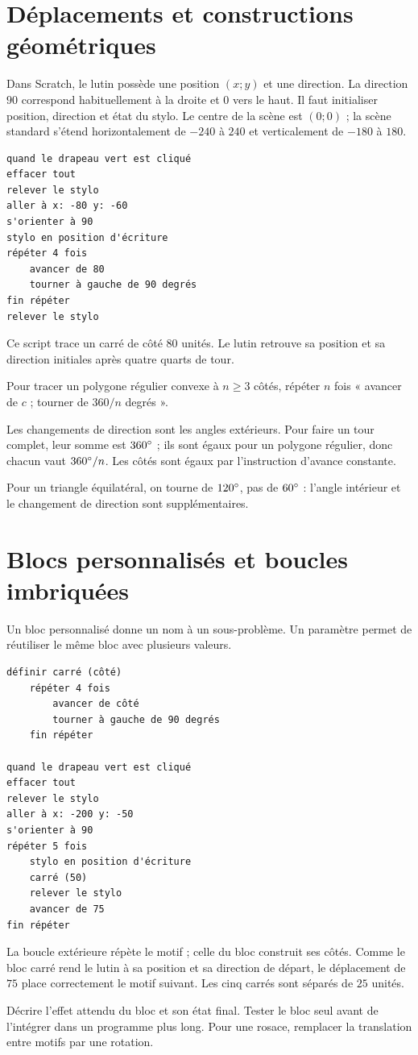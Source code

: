 \documentclass[../cours_3e.tex]{subfiles}
\begin{document}
\section{Déplacements et constructions géométriques}
Dans Scratch, le lutin possède une position $(x;y)$ et une direction. La direction $90$ correspond habituellement à la droite et $0$ vers le haut. Il faut initialiser position, direction et état du stylo. Le centre de la scène est $(0;0)$ ; la scène standard s'étend horizontalement de $-240$ à $240$ et verticalement de $-180$ à $180$.
\begin{lstlisting}
quand le drapeau vert est cliqué
effacer tout
relever le stylo
aller à x: -80 y: -60
s'orienter à 90
stylo en position d'écriture
répéter 4 fois
    avancer de 80
    tourner à gauche de 90 degrés
fin répéter
relever le stylo
\end{lstlisting}
Ce script trace un carré de côté $80$ unités. Le lutin retrouve sa position et sa direction initiales après quatre quarts de tour.
\begin{propriete}
Pour tracer un polygone régulier convexe à $n\geq3$ côtés, répéter $n$ fois « avancer de $c$ ; tourner de $360/n$ degrés ».
\end{propriete}
\begin{demonstration}
Les changements de direction sont les angles extérieurs. Pour faire un tour complet, leur somme est $360^{\circ}$ ; ils sont égaux pour un polygone régulier, donc chacun vaut $360^{\circ}/n$. Les côtés sont égaux par l'instruction d'avance constante.
\end{demonstration}
Pour un triangle équilatéral, on tourne de $120^{\circ}$, pas de $60^{\circ}$ : l'angle intérieur et le changement de direction sont supplémentaires.
\section{Blocs personnalisés et boucles imbriquées}
Un bloc personnalisé donne un nom à un sous-problème. Un paramètre permet de réutiliser le même bloc avec plusieurs valeurs.
\begin{lstlisting}
définir carré (côté)
    répéter 4 fois
        avancer de côté
        tourner à gauche de 90 degrés
    fin répéter

quand le drapeau vert est cliqué
effacer tout
relever le stylo
aller à x: -200 y: -50
s'orienter à 90
répéter 5 fois
    stylo en position d'écriture
    carré (50)
    relever le stylo
    avancer de 75
fin répéter
\end{lstlisting}
La boucle extérieure répète le motif ; celle du bloc construit ses côtés. Comme le bloc carré rend le lutin à sa position et sa direction de départ, le déplacement de $75$ place correctement le motif suivant. Les cinq carrés sont séparés de $25$ unités.
\begin{methode}
Décrire l'effet attendu du bloc et son état final. Tester le bloc seul avant de l'intégrer dans un programme plus long. Pour une rosace, remplacer la translation entre motifs par une rotation.
\end{methode}
\end{document}
